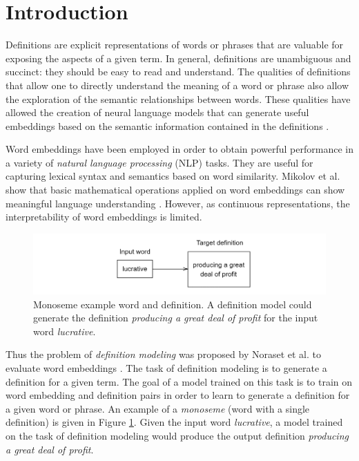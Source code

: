 \section{Introduction}
Definitions are explicit representations of words or phrases that are valuable
for exposing the aspects of a given term. In general, definitions are
unambiguous and succinct: they should be easy to read and understand. The
qualities of definitions that allow one to directly understand the meaning of a
word or phrase also allow the exploration of the semantic relationships between
words. These qualities have allowed the creation of neural language models that
can generate useful embeddings based on the semantic information contained in
the definitions \cite{bosc_auto_2018, hill_learning_2016}.

Word embeddings have been employed in order to obtain powerful performance in a
variety of \textit{natural language processing} (NLP) tasks. They are useful for
capturing lexical syntax and semantics based on word similarity. Mikolov et al.
show that basic mathematical operations applied on word embeddings can show
meaningful language understanding \cite{mikolov_distributed_2013}. However, as
continuous representations, the interpretability of word embeddings is limited.

\begin{figure}[h]
    \centering
    \includegraphics[width=1\textwidth]{assets/figures/monoseme.png}
    \caption{Monoseme example word and definition. A definition model could generate the definition \textit{producing a great deal of profit} for the input word \textit{lucrative}.}
    \label{fig:monoseme}
\end{figure}

Thus the problem of \textit{definition modeling} was proposed by Noraset et al.
to evaluate word embeddings \cite{noraset_definition_2016}. The task of
definition modeling is to generate a definition for a given term. The goal of a
model trained on this task is to train on word embedding and definition pairs in
order to learn to generate a definition for a given word or phrase. An example of a \textit{monoseme} (word with a single definition) is given in Figure \ref{fig:monoseme}. Given the input word \textit{lucrative},
a model trained on the task of definition modeling would produce the output
definition \textit{producing a great deal of profit}.

